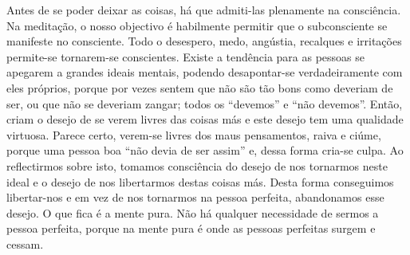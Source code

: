 Antes de se poder deixar as coisas, há que admiti-las plenamente na consciência. Na meditação, o nosso objectivo é
habilmente permitir que o subconsciente se manifeste no
consciente. Todo o desespero, medo, angústia, recalques e
irritações permite-se tornarem-se conscientes. Existe a
tendência para as pessoas se apegarem a grandes ideais mentais,
podendo desapontar-se verdadeiramente com eles próprios,
porque por vezes sentem que não são tão bons como deveriam
de ser, ou que não se deveriam zangar; todos os “devemos” e
“não devemos”. Então, criam o desejo de se verem livres das
coisas más e este desejo tem uma qualidade virtuosa. Parece
certo, verem-se livres dos maus pensamentos, raiva e ciúme,
porque uma pessoa boa “não devia de ser assim” e, dessa
forma cria-se culpa.
Ao reflectirmos sobre isto, tomamos consciência do
desejo de nos tornarmos neste ideal e o desejo de nos libertarmos destas coisas más. Desta forma conseguimos libertar-nos
e em vez de nos tornarmos na pessoa perfeita, abandonamos
esse desejo. O que fica é a mente pura. Não há qualquer
necessidade de sermos a pessoa perfeita, porque na mente
pura é onde as pessoas perfeitas surgem e cessam.

